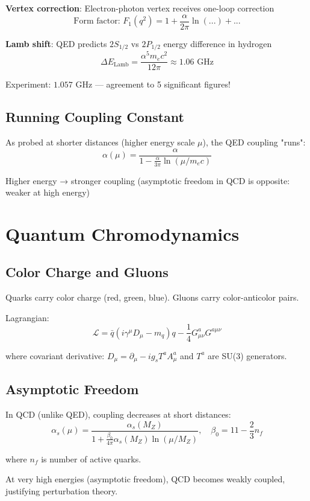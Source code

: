 \documentclass[12pt,openany,oneside]{book}
\begin{document}
{{{\textbf{Vertex correction}: Electron-photon vertex receives one-loop correction
\[
\text{Form factor: } F_1(q^2) = 1 + \frac{\alpha}{2\pi}\ln(...) + ...
\]

\textbf{Lamb shift}: QED predicts $2S_{1/2}$ vs $2P_{1/2}$ energy difference in hydrogen
\[
\Delta E_{\text{Lamb}} = \frac{\alpha^5 m_e c^2}{12\pi} \approx 1.06 \text{ GHz}
\]

Experiment: $1.057 \text{ GHz}$ — agreement to 5 significant figures!

\section{Running Coupling Constant}

As probed at shorter distances (higher energy scale $\mu$), the QED coupling "runs":
\[
\alpha(\mu) = \frac{\alpha}{1 - \frac{\alpha}{3\pi}\ln(\mu/m_e c)}
\]

Higher energy → stronger coupling (asymptotic freedom in QCD is opposite: weaker at high energy)

\chapter{Quantum Chromodynamics}

\section{Color Charge and Gluons}

Quarks carry color charge (red, green, blue). Gluons carry color-anticolor pairs.

Lagrangian:
\[
\mathcal{L} = \bar{q}(i\gamma^\mu D_\mu - m_q)q - \frac{1}{4}G_{\mu\nu}^a G^{a\mu\nu}
\]

where covariant derivative: $D_\mu = \partial_\mu - ig_s T^a A_\mu^a$ and $T^a$ are SU(3) generators.

\section{Asymptotic Freedom}

In QCD (unlike QED), coupling decreases at short distances:
\[
\alpha_s(\mu) = \frac{\alpha_s(M_Z)}{1 + \frac{\beta_0}{4\pi}\alpha_s(M_Z)\ln(\mu/M_Z)}, \quad \beta_0 = 11 - \frac{2}{3}n_f
\]

where $n_f$ is number of active quarks.

At very high energies (asymptotic freedom), QCD becomes weakly coupled, justifying perturbation theory.

}}}
\end{document}

